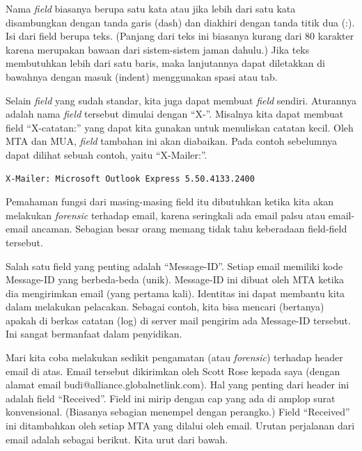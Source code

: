 Nama {\em field} biasanya berupa satu kata atau jika lebih dari satu kata
disambungkan dengan tanda garis (dash) dan diakhiri dengan tanda titik dua (:).
Isi dari field berupa teks. (Panjang dari teks ini biasanya kurang dari 80
karakter karena merupakan bawaan dari sistem-sistem jaman dahulu.) Jika teks
membutuhkan lebih dari satu baris, maka lanjutannya dapat diletakkan di
bawahnya dengan masuk (indent) menggunakan spasi atau tab.

Selain {\em field} yang sudah standar, kita juga dapat membuat {\em field}
sendiri. Aturannya adalah nama {\em field} tersebut dimulai dengan ``X-''.
Misalnya kita dapat membuat field ``X-catatan:'' yang dapat kita gunakan untuk
menuliskan catatan kecil. Oleh MTA dan MUA, {\em field} tambahan ini akan
diabaikan. Pada contoh sebelumnya dapat dilihat sebuah contoh, yaitu
``X-Mailer:''.

\begin{verbatim}
X-Mailer: Microsoft Outlook Express 5.50.4133.2400
\end{verbatim}

Pemahaman fungsi dari masing-masing field itu dibutuhkan ketika kita akan
melakukan {\em forensic} terhadap email, karena seringkali ada email palsu atau
email-email ancaman. Sebagian besar orang memang tidak tahu keberadaan
field-field tersebut.

Salah satu field yang penting adalah ``Message-ID''. Setiap email memiliki kode
Message-ID yang berbeda-beda (unik). Message-ID ini dibuat oleh MTA ketika dia
mengirimkan email (yang pertama kali). Identitas ini dapat membantu kita dalam
melakukan pelacakan. Sebagai contoh, kita bisa mencari (bertanya) apakah di
berkas catatan (log) di server mail pengirim ada Message-ID tersebut. Ini
sangat bermanfaat dalam penyidikan.

Mari kita coba melakukan sedikit pengamatan (atau {\em forensic}) terhadap
header email di atas. Email tersebut dikirimkan oleh Scott Rose kepada saya
(dengan alamat email budi@alliance.globalnetlink.com). Hal yang penting dari
header ini adalah field ``Received''. Field ini mirip dengan cap yang ada di
amplop surat konvensional. (Biasanya sebagian menempel dengan perangko.) Field
``Received'' ini ditambahkan oleh setiap MTA yang dilalui oleh email. Urutan
perjalanan dari email adalah sebagai berikut. Kita urut dari bawah.

